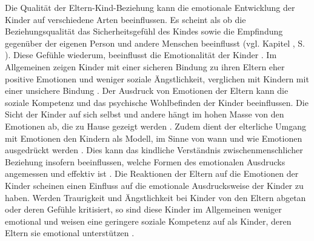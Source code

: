 Die Qualität der Eltern-Kind-Beziehung kann die emotionale Entwicklung der Kinder auf verschiedene Arten beeinflussen. Es scheint als ob die Beziehungsqualität das Sicherheitsgefühl des Kindes sowie die Empfindung gegenüber der eigenen Person und andere Menschen beeinflusst (vgl. Kapitel , S. \pageref{sec:Bindung}). Diese Gefühle wiederum, beeinflusst die Emotionalität der Kinder \cite[S.~561]{Siegler2008}. Im Allgemeinen zeigen Kinder mit einer sicheren Bindung zu ihren Eltern eher positive Emotionen und weniger soziale Ängstlichkeit, verglichen mit Kindern mit einer unsichere Bindung \cite{Bohlin2000}. Der Ausdruck von Emotionen der Eltern kann die soziale Kompetenz und das psychische Wohlbefinden der Kinder beeinflussen. Die Sicht der Kinder auf sich selbst und andere hängt im hohen Masse von den Emotionen ab, die zu Hause gezeigt werden \cite{Dunsmore1997}. Zudem dient der elterliche Umgang mit Emotionen den Kindern als Modell, im Sinne von wann und wie Emotionen ausgedrückt werden \cite{Denham1994}. Dies kann das kindliche Verständnis zwischenmenschlicher Beziehung insofern beeinflussen, welche Formen des emotionalen Ausdrucks angemessen und effektiv ist \cite{Halberstadt1995}. Die Reaktionen der Eltern auf die Emotionen der Kinder scheinen einen Einfluss auf die emotionale Ausdrucksweise der Kinder zu haben. Werden Traurigkeit und Ängstlichkeit bei Kinder von den Eltern abgetan oder deren Gefühle kritisiert, so sind diese Kinder im Allgemeinen weniger emotional und weisen eine geringere soziale Kompetenz auf als Kinder, deren Eltern sie emotional unterstützen \cite{Eisenberg1998, McDowell2000}. 

